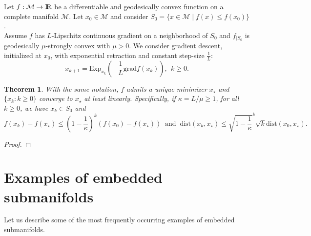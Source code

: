 \documentclass[10pt,a4paper]{book}
\theoremstyle{definition}
\theoremstyle{plain}
\newtheorem{thm}{Theorem}[section]
\theoremstyle{remark}
\newcommand{\grad}{\textrm{grad}}
\newcommand \M {\mathcal{M}}
\def\R{{\rm I\kern-0.16em R}}
\begin{document}
\par \medskip Let $f:\M \to \R$ be a differentiable and geodesically convex function on a complete manifold $\M$. Let $x_0\in \M$ and consider $S_0=\{x\in \M\mid f(x)\leq f(x_0)\}$. \\
Assume $f$ has $L$-Lipschitz continuous gradient on a neighborhood of $S_0$ and $f_{\mid S_0}$ is geodesically $\mu$-strongly convex with $\mu>0$. We consider gradient descent, initialized at $x_0$, with exponential retraction and constant step-size $\frac{1}{L}$:
$$x_{k+1}=\text{Exp}_{x_k}\left(-\frac{1}{L}\grad f(x_k)\right),~~k\ge 0.$$
\begin{thm}
With the same notation, $f$ admits a unique minimizer $x_{\star}$ and $\{x_k: k\ge 0\}$ converge to $x_{\star}$ at least linearly. Specifically, if $\kappa=L/\mu\ge 1$, for all $k\ge 0$, we have $x_k \in S_0$  and
$$f(x_k)-f(x_{\star})\leq \left(1-\frac{1}{\kappa}\right)^{k}(f(x_0)-f(x_{\star}))~\text{ and }~\text{dist}(x_k,x_{\star})\leq \sqrt{1-\frac{1}{\kappa}}^k\sqrt{k}\text{dist}(x_0,x_{\star}).$$
\end{thm}
\begin{proof}

\end{proof}

\chapter{Examples of embedded submanifolds}



Let us describe some of the most frequently occurring examples of embedded submanifolds.
\end{document}
